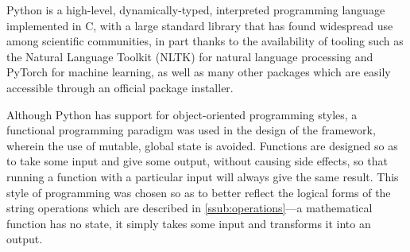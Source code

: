 \documentclass[a4paper,12pt,leqno]{article}
\begin{document}
Python is a high-level, dynamically-typed, interpreted programming language implemented in C, with a large standard library that has found widespread use among scientific communities, in part thanks to the availability of tooling such as the Natural Language Toolkit (NLTK) \citep{Bird2009} for natural language processing and PyTorch \citep{ketkar2017introduction} for machine learning, as well as many other packages which are easily accessible through an official package installer.

Although Python has support for object-oriented programming styles, a functional programming paradigm was used in the design of the framework, wherein the use of mutable, global state is avoided. Functions are designed so as to take some input and give some output, without causing side effects, so that running a function with a particular input will always give the same result. This style of programming was chosen so as to better reflect the logical forms of the string operations which are described in \cref{ssub:operations}---a mathematical function has no state, it simply takes some input and transforms it into an output.
\end{document}
